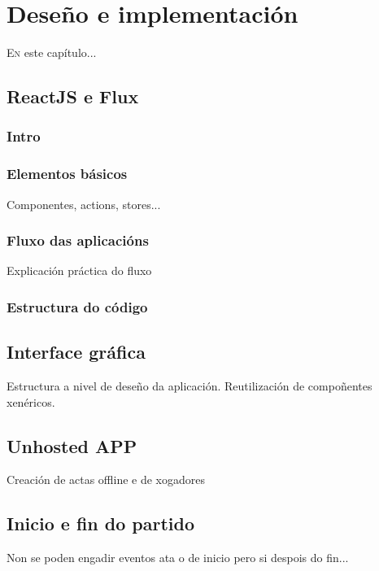 \chapter{Deseño e implementación}
\minitoc
\label{chap:Desenoeimplementacion}
\vspace{0.5cm}


  \lettrine{E}{n} este capítulo...

  \section{ReactJS e Flux}
    \subsection{Intro}
    \subsection{Elementos básicos}
    Componentes, actions, stores...
    \subsection{Fluxo das aplicacións}
    Explicación práctica do fluxo
    \subsection{Estructura do código}

  \section{Interface gráfica}
  Estructura a nivel de deseño da aplicación. Reutilización de compoñentes xenéricos.

  \section{Unhosted APP}
  Creación de actas offline e de xogadores

  \section{Inicio e fin do partido}
  Non se poden engadir eventos ata o de inicio pero si despois do fin...
  
